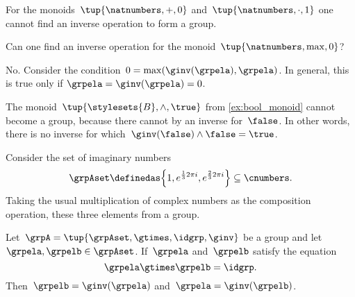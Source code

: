 \begin{example}
    For the monoids~$\tup{\natnumbers, +,0}$ and~$\tup{\natnumbers,\cdot ,1}$ one cannot find an inverse operation to form a group.
\end{example}

\begin{exercise}
    Can one find an inverse operation for the monoid~$\tup{\natnumbers,\max,0}$?
\end{exercise}
%
\begin{solution}
    No.
    Consider the condition~$0=\max(\ginv(\grpela),\grpela)$.
    In general, this is true only if $\grpela=\ginv(\grpela)=0$.
\end{solution}

\begin{example}
    The monoid~$\tup{\stylesets{B},\wedge, \true}$ from \cref{ex:bool_monoid} cannot become a group, because there cannot by an inverse for~$\false$.
    In other words, there is no inverse for which~$\ginv(\false)\wedge \false=\true$.
\end{example}
\begin{example}
    \label{grp-order-three}
    Consider the set of imaginary numbers
    \begin{equation*}
        \grpAset \definedas \Big\{ 1, e^{\frac{1}{3}2\pi i}, e^{\frac{2 }{3}2\pi i}  \Big\} \subseteq \cnumbers.
    \end{equation*}
    Taking the usual multiplication of complex numbers as the composition operation, these three elements from a group.
\end{example}



\begin{lemma}
    \label{lem:inv-op-unique}
    Let~$\grpA = \tup{ \grpAset, \gtimes, \idgrp, \ginv }$ be a group and let~$\grpela, \grpelb \in \grpAset$.
    If~$\grpela$ and~$\grpelb$ satisfy the equation
    \begin{equation}
        \grpela \gtimes \grpelb = \idgrp.
    \end{equation}
    Then~$\grpelb = \ginv( \grpela )$ and~$\grpela = \ginv(\grpelb)$.
\end{lemma}

